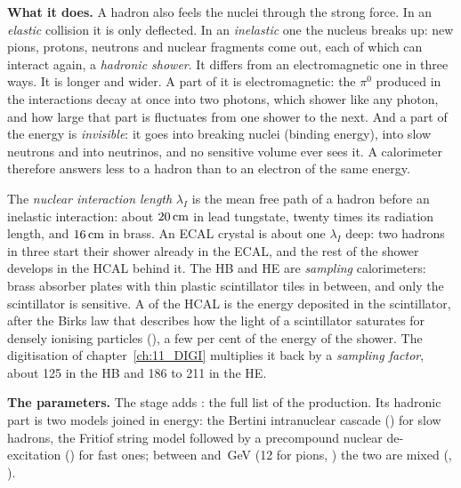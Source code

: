 \textbf{What it does.} A hadron also feels the nuclei through the strong force. In an \emph{elastic} collision it
is only deflected. In an \emph{inelastic} one the nucleus breaks up: new pions, protons, neutrons and nuclear
fragments come out, each of which can interact again, a \emph{hadronic shower}. It differs from an electromagnetic
one in three ways. It is longer and wider. A part of it is electromagnetic: the $\pi^0$ produced in the interactions
decay at once into two photons, which shower like any photon, and how large that part is fluctuates from one shower
to the next. And a part of the energy is \emph{invisible}: it goes into breaking nuclei (binding energy), into slow
neutrons and into neutrinos, and no sensitive volume ever sees it. A calorimeter therefore answers less to a hadron
than to an electron of the same energy.

\begin{plainwords}
The \emph{nuclear interaction length} $\lambda_I$ is the mean free path of a hadron before an inelastic
interaction: about $20\,\mathrm{cm}$ in lead tungstate, twenty times its radiation length, and $16\,\mathrm{cm}$ in brass. An ECAL crystal
is about one $\lambda_I$ deep: two hadrons in three start their shower already in the ECAL, and the rest of the
shower develops in the HCAL behind it. The HB and HE are \emph{sampling} calorimeters: brass absorber plates with
thin plastic scintillator tiles in between, and only the scintillator is sensitive. A  of the HCAL is
the energy deposited in the scintillator, after the Birks law that describes how the light of a scintillator
saturates for densely ionising particles (), a few per cent of the energy of the shower. The
digitisation of chapter~\ref{ch:11_DIGI} multiplies it back by a \emph{sampling factor}, about 125 in the HB and 186
to 211 in the HE.
\end{plainwords}

\textbf{The parameters.} The stage  adds : the full list 
of the production. Its hadronic part is two models joined in energy: the Bertini intranuclear cascade ()
for slow hadrons, the Fritiof string model followed by a precompound nuclear de-excitation () for fast ones;
between  and \,GeV (12 for pions, ) the two are mixed
(, ).

